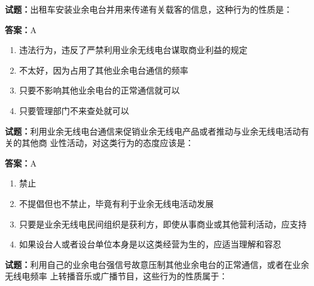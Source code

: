\documentclass{ctexbook}
\begin{document}




\vspace{1em}

\textbf{试题：}出租车安装业余电台并用来传递有关载客的信息，这种行为的性质是： 

\textbf{答案：}A 

\begin{enumerate}[leftmargin=3em]
  \item 违法行为，违反了严禁利用业余无线电台谋取商业利益的规定 

  \item 不太好，因为占用了其他业余电台通信的频率 

  \item 只要不影响其他业余电台的正常通信就可以 

  \item 只要管理部门不来查处就可以 

\end{enumerate}





\vspace{1em}

\textbf{试题：}利用业余无线电台通信来促销业余无线电产品或者推动与业余无线电活动有关的其他商
业性活动，对这类行为的态度应该是： 

\textbf{答案：}A 


\begin{enumerate}[leftmargin=3em]
  \item 禁止 

  \item 不提倡但也不禁止，毕竟有利于业余无线电活动发展 

  \item 只要是业余无线电民间组织是获利方，即使从事商业或其他营利活动，应支持 

  \item 如果设台人或者设台单位本身是以这类经营为生的，应适当理解和容忍 

\end{enumerate}





\vspace{1em}

\textbf{试题：}利用自己的业余电台强信号故意压制其他业余电台的正常通信，或者在业余无线电频率
上转播音乐或广播节目，这些行为的性质属于： 
\end{document}
